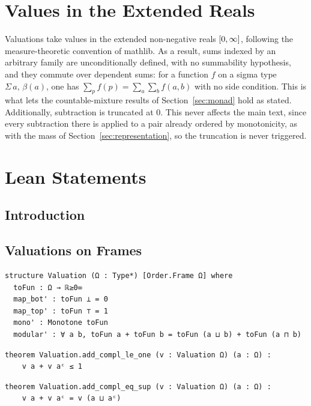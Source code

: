 \section{Values in the Extended Reals}
\label{app:ennreal}

Valuations take values in the extended non-negative reals $[0,\infty]$,
following the measure-theoretic convention of \textsf{mathlib}.  
As a result,
sums indexed by an arbitrary family are unconditionally defined, with no
summability hypothesis, and they commute over dependent sums: for a
function $f$ on a sigma type $\Sigma\,a,\,\beta(a)$, one has
$\sum_{p} f(p) = \sum_{a} \sum_{b} f(a, b)$ with no side condition.  This
is what lets the countable-mixture results of
Section~\ref{sec:monad} hold as stated.  Additionally, subtraction is
truncated at $0$.  This never affects the main text, since every
subtraction there is applied to a pair already ordered by monotonicity,
as with the mass of Section~\ref{sec:representation}, so the truncation
is never triggered.

\section{Lean Statements}
\label{app:lean}

\subsection{Introduction}

\subsection{Valuations on Frames}

\label{lean:valuation}
\begin{lstlisting}
structure Valuation (Ω : Type*) [Order.Frame Ω] where
  toFun : Ω → ℝ≥0∞
  map_bot' : toFun ⊥ = 0
  map_top' : toFun ⊤ = 1
  mono' : Monotone toFun
  modular' : ∀ a b, toFun a + toFun b = toFun (a ⊔ b) + toFun (a ⊓ b)
\end{lstlisting}

\label{lean:add-compl-le-one}
\begin{lstlisting}
theorem Valuation.add_compl_le_one (v : Valuation Ω) (a : Ω) :
    v a + v aᶜ ≤ 1
\end{lstlisting}

\label{lean:valuation-add-compl-eq-sup}
\begin{lstlisting}
theorem Valuation.add_compl_eq_sup (v : Valuation Ω) (a : Ω) :
    v a + v aᶜ = v (a ⊔ aᶜ)
\end{lstlisting}

